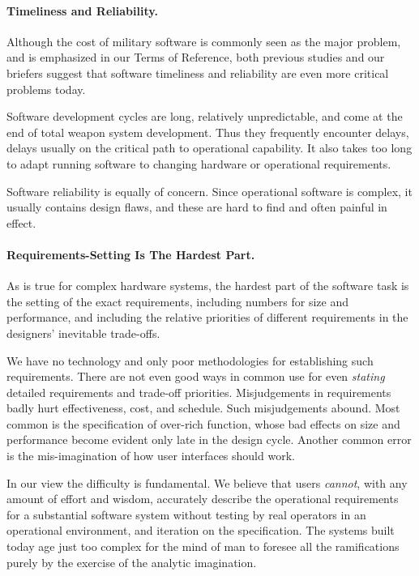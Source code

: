 \documentclass[11pt,final]{article}
\begin{document}
\paragraph{Timeliness and Reliability.} Although the cost of military software
is commonly seen as the major problem, and is emphasized in our Terms of
Reference, both previous studies and our briefers suggest that software
timeliness and reliability are even more critical problems today.

Software development cycles are long, relatively unpredictable, and come at the
end of total weapon system development. Thus they frequently encounter delays,
delays usually on the critical path to operational capability. It also takes
too long to adapt running software to changing hardware or operational
requirements.

Software reliability is equally of concern. Since operational software is
complex, it usually contains design flaws, and these are hard to find and often
painful in effect.

\paragraph{Requirements-Setting Is The Hardest Part.} As is true for complex
hardware systems, the hardest part of the software task is the setting of the
exact requirements, including numbers for size and performance, and including
the relative priorities of different requirements in the designers’ inevitable
trade-offs.

We have no technology and only poor methodologies for establishing such
requirements. There are not even good ways in common use for even
\emph{stating} detailed requirements and trade-off priorities. Misjudgements in
requirements badly hurt effectiveness, cost, and schedule. Such misjudgements
abound. Most common is the specification of over-rich function, whose bad
effects on size and performance become evident only late in the design cycle.
Another common error is the mis-imagination of how user interfaces should work.

In our view the difficulty is fundamental. We believe that users \emph{cannot},
with any amount of effort and wisdom, accurately describe the operational
requirements for a substantial software system without testing by real
operators in an operational environment, and iteration on the specification.
The systems built today age just too complex for the mind of man to foresee all
the ramifications purely by the exercise of the analytic imagination.
\end{document}
